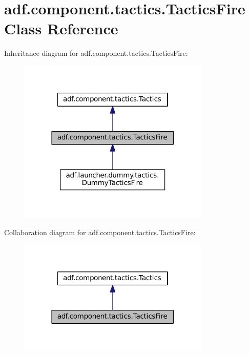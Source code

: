 \hypertarget{classadf_1_1component_1_1tactics_1_1TacticsFire}{}\section{adf.\+component.\+tactics.\+Tactics\+Fire Class Reference}
\label{classadf_1_1component_1_1tactics_1_1TacticsFire}


Inheritance diagram for adf.\+component.\+tactics.\+Tactics\+Fire\+:
\nopagebreak
\begin{figure}[H]
\begin{center}
\leavevmode
\includegraphics[width=258pt]{classadf_1_1component_1_1tactics_1_1TacticsFire__inherit__graph}
\end{center}
\end{figure}


Collaboration diagram for adf.\+component.\+tactics.\+Tactics\+Fire\+:
\nopagebreak
\begin{figure}[H]
\begin{center}
\leavevmode
\includegraphics[width=258pt]{classadf_1_1component_1_1tactics_1_1TacticsFire__coll__graph}
\end{center}
\end{figure}
